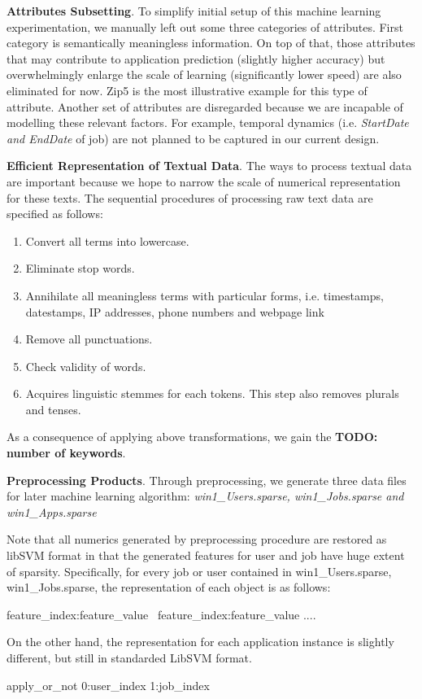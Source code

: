 \documentclass{article} %
\begin{document}
{\bf Attributes Subsetting}.
To simplify initial setup of this machine learning experimentation, we
manually left out some three categories of attributes. First category is
semantically meaningless information. On top of that, those attributes that may contribute to
application prediction (slightly higher accuracy) but overwhelmingly enlarge
the scale of learning (significantly lower speed) are also eliminated for now.
Zip5 is the most illustrative example for this type of attribute.
Another set of attributes are disregarded because we are incapable of
modelling these relevant factors. For example, temporal dynamics (i.e. {\it
    StartDate and EndDate} of job) are not planned to be captured in our
current design. 

{\bf Efficient Representation of Textual Data}.
The ways to process textual data are important because we hope to narrow the
scale of numerical representation for these texts.  The sequential procedures
of processing raw text data are specified as follows:
\begin{enumerate}[label=(\roman*)]
  \item{Convert all terms into lowercase.}
  \item{Eliminate stop words.}
  \item{Annihilate all meaningless terms with particular forms, i.e.
          timestamps, datestamps, IP addresses, phone numbers and webpage link}
  \item{Remove all punctuations.}
  \item{Check validity of words.}
  \item{Acquires linguistic stemmes for each tokens. This step also removes
          plurals and tenses.}
\end{enumerate}
As a consequence of applying above transformations, we gain the {\bf TODO: number of
keywords}. 

{\bf Preprocessing Products}.
Through preprocessing, we generate three data files for later machine learning
algorithm: {\it win1\_Users.sparse, win1\_Jobs.sparse and win1\_Apps.sparse}

Note that all numerics generated by preprocessing procedure are restored as libSVM
format in that the generated features for user and job have huge extent of sparsity. 
Specifically, for every job or user contained in win1\_Users.sparse,
win1\_Jobs.sparse, the representation of each object is as follows:
\begin{center}
    feature\_index:feature\_value \ feature\_index:feature\_value .... 
\end{center}
On the other hand, the representation for each application instance is slightly different,
but still in standarded LibSVM format. 
\begin{center}
    apply\_or\_not 0:user\_index 1:job\_index
\end{center}
\end{document}
